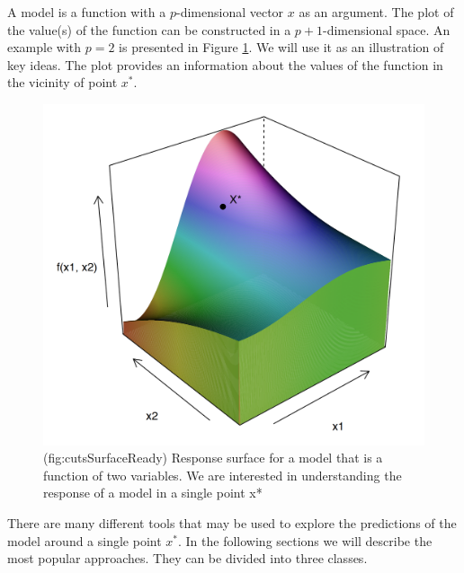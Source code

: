 \documentclass[12pt,]{krantz}
\theoremstyle{definition}
\theoremstyle{definition}
\theoremstyle{definition}
\theoremstyle{remark}
\begin{document}
A model is a function with a \(p\)-dimensional vector \(x\) as an
argument. The plot of the value(s) of the function can be constructed in
a \(p+1\)-dimensional space. An example with \(p=2\) is presented in
Figure \ref{fig:cutsSurfaceReady}. We will use it as an illustration of
key ideas. The plot provides an information about the values of the
function in the vicinity of point \(x^*\).

\begin{figure}

{\centering \includegraphics[width=0.6\linewidth]{figure/cuts_surface_ready_punkt} 

}

\caption{(fig:cutsSurfaceReady) Response surface for a model that is a function of two variables. We are interested in understanding the response of a model in a single point x*}\label{fig:cutsSurfaceReady}
\end{figure}

There are many different tools that may be used to explore the
predictions of the model around a single point \(x^*\). In the following
sections we will describe the most popular approaches. They can be
divided into three classes.
\end{document}
